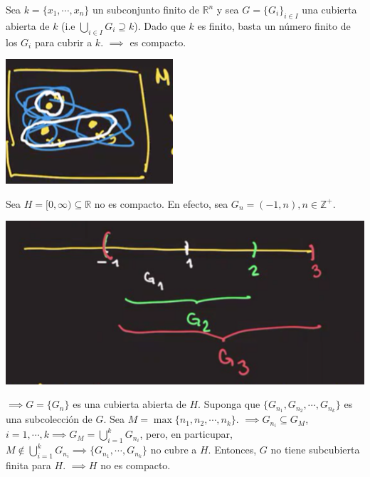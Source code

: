 \begin{ejemplo}
	Sea $k=\{x_1,\cdots, x_n\}$ un subconjunto finito de $\mathbb{R}^n$ y sea $G=\{G_i\}_{i\in I}$ una cubierta abierta de $k$ (i.e $\bigcup_{i\in I}G_i \supseteq k$). Dado que $k$ es finito, basta un número finito de los $G_i$ para cubrir a $k$. $\implies$ es compacto. 
	\begin{center}
		\includegraphics[scale=0.6]{images/2/23}
	\end{center}
\end{ejemplo}

\begin{ejemplo}
	Sea $H=[0,\infty)\subseteq \mathbb{R}$ no es compacto. En efecto, sea $G_n=(-1,n), n\in\mathbb{Z}^+$. 
	\begin{center}
		\includegraphics[scale=0.4]{images/2/24}
	\end{center}
$\implies G=\{G_n\}$ es una cubierta abierta de $H$. Suponga que $\{G_{n_1},G_{n_2},\cdots, G_{n_k}\}$ es una subcolección de $G$. Sea $M=\max\{n_1,n_2,\cdots, n_k\}$. $\implies G_{n_i}\subseteq G_M$, $i=1,\cdots, k \implies G_M=\bigcup_{i=1}^k  G_{n_i}$, pero, en particupar, $M\not\in \bigcup_{i=1}^k G_{n_i}\implies \{G_{n_1}, \cdots, G_{n_k}\}$ no cubre a $H$. Entonces, $G$ no tiene subcubierta finita para $H$. $\implies H$ no es compacto. 
\end{ejemplo}

